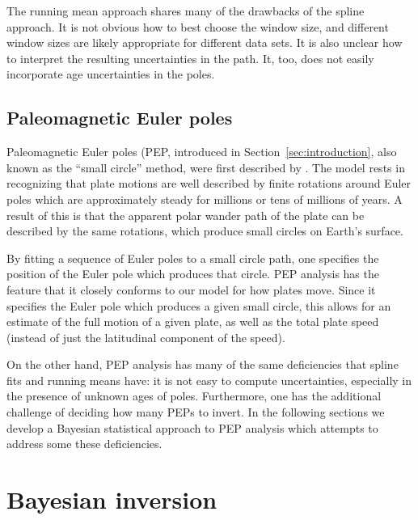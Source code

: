 \documentclass[preprint,12pt,authoryear]{elsarticle}
\begin{document}
The running mean approach shares many of the drawbacks of the spline approach. 
It is not obvious how to best choose the window size, and different window sizes are
likely appropriate for different data sets. 
It is also unclear how to interpret the resulting uncertainties in the path.
It, too, does not easily incorporate age uncertainties in the poles.

\subsection{Paleomagnetic Euler poles}
Paleomagnetic Euler poles (PEP, introduced in Section~\ref{sec:introduction}, 
also known as the ``small circle'' method, were first described by \citet{gordon1984paleomagnetic}.
The model rests in recognizing that plate motions are well described by finite
rotations around Euler poles which are approximately steady for millions or 
tens of millions of years. A result of this is that the apparent polar
wander path of the plate can be described by the same rotations, which
produce small circles on Earth's surface.

By fitting a sequence of Euler poles to a small circle path, one specifies
the position of the Euler pole which produces that circle.
PEP analysis has the feature that it closely conforms to our model for how plates move.
Since it specifies the Euler pole which produces a given small circle,
this allows for an estimate of the full motion of a given plate, 
as well as the total plate speed (instead of just the latitudinal component of the speed).

On the other hand, PEP analysis has many of the same
deficiencies that spline fits and running means have: it is not easy to compute
uncertainties, especially in the presence of unknown ages of poles.
Furthermore, one has the additional challenge of deciding how many PEPs to invert.
In the following sections we develop a Bayesian statistical approach to
PEP analysis which attempts to address some these deficiencies.

\section{Bayesian inversion}
\label{sec:bayesian_inversion}
\end{document}
